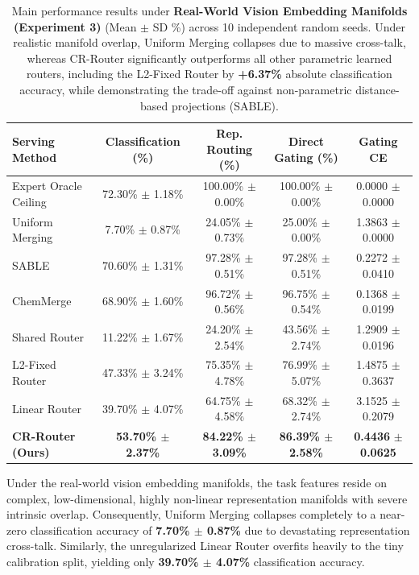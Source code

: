 \begin{table}[t]
\centering
\small
\setlength{\tabcolsep}{2.5pt}
\caption{Main performance results under \textbf{Real-World Vision Embedding Manifolds (Experiment 3)} (Mean $\pm$ SD \%) across 10 independent random seeds. Under realistic manifold overlap, Uniform Merging collapses due to massive cross-talk, whereas CR-Router significantly outperforms all other parametric learned routers, including the L2-Fixed Router by \textbf{+6.37\%} absolute classification accuracy, while demonstrating the trade-off against non-parametric distance-based projections (SABLE).}
\vskip 0.15in
\label{tab:real_world_results}
\begin{tabular*}{\textwidth}{@{\extracolsep{\fill}}lcccc}
\toprule
\textbf{Serving Method} & \textbf{Classification (\%)} & \textbf{Rep. Routing (\%)} & \textbf{Direct Gating (\%)} & \textbf{Gating CE} \\
\midrule
Expert Oracle Ceiling & 72.30\% $\pm$ 1.18\% & 100.00\% $\pm$ 0.00\% & 100.00\% $\pm$ 0.00\% & 0.0000 $\pm$ 0.0000 \\
Uniform Merging & 7.70\% $\pm$ 0.87\% & 24.05\% $\pm$ 0.73\% & 25.00\% $\pm$ 0.00\% & 1.3863 $\pm$ 0.0000 \\
SABLE \cite{sable2025samplewise} & 70.60\% $\pm$ 1.31\% & 97.28\% $\pm$ 0.51\% & 97.28\% $\pm$ 0.51\% & 0.2272 $\pm$ 0.0410 \\
ChemMerge \cite{chemmerge2025kinetics} & 68.90\% $\pm$ 1.60\% & 96.72\% $\pm$ 0.56\% & 96.75\% $\pm$ 0.54\% & 0.1368 $\pm$ 0.0199 \\
Shared Router & 11.22\% $\pm$ 1.67\% & 24.20\% $\pm$ 2.54\% & 43.56\% $\pm$ 2.74\% & 1.2909 $\pm$ 0.0196 \\
L2-Fixed Router & 47.33\% $\pm$ 3.24\% & 75.35\% $\pm$ 4.78\% & 76.99\% $\pm$ 5.07\% & 1.4875 $\pm$ 0.3637 \\
Linear Router & 39.70\% $\pm$ 4.07\% & 64.75\% $\pm$ 4.58\% & 68.32\% $\pm$ 2.74\% & 3.1525 $\pm$ 0.2079 \\
\midrule
\textbf{CR-Router (Ours)} & \textbf{53.70\% $\pm$ 2.37\%} & \textbf{84.22\% $\pm$ 3.09\%} & \textbf{86.39\% $\pm$ 2.58\%} & \textbf{0.4436} $\pm$ \textbf{0.0625} \\
\bottomrule
\end{tabular*}
\end{table}

Under the real-world vision embedding manifolds, the task features reside on complex, low-dimensional, highly non-linear representation manifolds with severe intrinsic overlap. Consequently, Uniform Merging collapses completely to a near-zero classification accuracy of \textbf{7.70\% $\pm$ 0.87\%} due to devastating representation cross-talk. Similarly, the unregularized Linear Router overfits heavily to the tiny calibration split, yielding only \textbf{39.70\% $\pm$ 4.07\%} classification accuracy.

